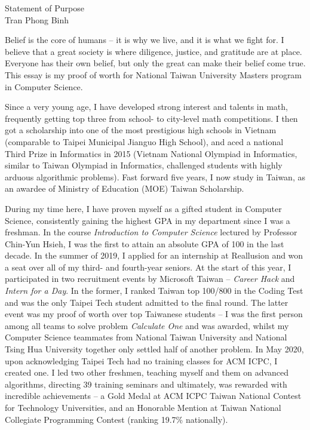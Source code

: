 \documentclass[letterpaper,12pt]{article}
\begin{document}
\begin{center}
{\Large Statement of Purpose} \\[.3in]
{\large Tran Phong Binh}
\end{center}

\vspace*{.5in}

Belief is the core of humans -- it is why we live, and it is what we fight for. I believe that a great society is where diligence, justice, and gratitude are at place.  Everyone has their own belief, but only the great can make their belief come true. This essay is my proof of worth for National Taiwan University Masters program in Computer Science.

Since a very young age, I have developed strong interest and talents in math, frequently getting top three from school- to city-level math competitions. I then got a scholarship into one of the most prestigious high schools in Vietnam (comparable to Taipei Municipal Jianguo High School), and aced a national Third Prize in Informatics in 2015 (Vietnam National Olympiad in Informatics, similar to Taiwan Olympiad in Informatics, challenged students with highly arduous algorithmic problems). Fast forward five years, I now study in Taiwan, as an awardee of Ministry of Education (MOE) Taiwan Scholarship.

During my time here, I have proven myself as a gifted student in Computer Science, consistently gaining the highest GPA in my department since I was a freshman. In the course \textit{Introduction to Computer Science} lectured by Professor Chin-Yun Hsieh, I was the first to attain an absolute GPA of 100 in the last decade. In the summer of 2019, I applied for an internship at Reallusion and won a seat over all of my third- and fourth-year seniors. At the start of this year, I participated in two recruitment events by Microsoft Taiwan -- \textit{Career Hack} and \textit{Intern for a Day}. In the former, I ranked Taiwan top 100/800 in the Coding Test and was the only Taipei Tech student admitted to the final round. The latter event was my proof of worth over top Taiwanese students -- I was the first person among all teams to solve problem \textit{Calculate One} and was awarded, whilst my Computer Science teammates from National Taiwan University and National Tsing Hua University together only settled half of another problem. In May 2020, upon acknowledging Taipei Tech had no training classes for ACM ICPC, I created one. I led two other freshmen, teaching myself and them on advanced algorithms, directing 39 training seminars and ultimately, was rewarded with incredible achievements -- a Gold Medal at ACM ICPC Taiwan National Contest for Technology Universities, and an Honorable Mention at Taiwan National Collegiate Programming Contest (ranking 19.7\% nationally).
\end{document}
